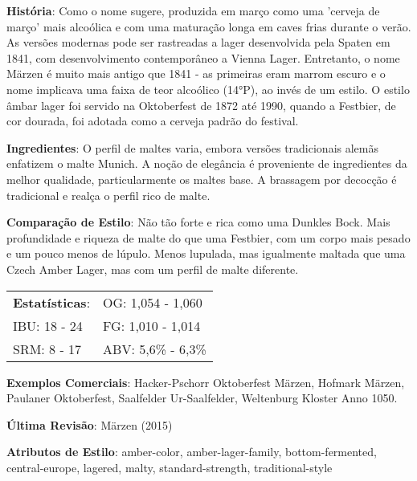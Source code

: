 \textbf{História}: Como o nome sugere, produzida em março como uma 'cerveja de março' mais alcoólica e com uma maturação longa em caves frias durante o verão. As versões modernas pode ser rastreadas a lager desenvolvida pela Spaten em 1841, com desenvolvimento contemporâneo a Vienna Lager. Entretanto, o nome Märzen é muito mais antigo que 1841 - as primeiras eram marrom escuro e o nome implicava uma faixa de teor alcoólico (14°P), ao invés de um estilo. O estilo âmbar lager foi servido na Oktoberfest de 1872 até 1990, quando a Festbier, de cor dourada, foi adotada como a cerveja padrão do festival.

\textbf{Ingredientes}: O perfil de maltes varia, embora versões tradicionais alemãs enfatizem o malte Munich. A noção de elegância é proveniente de ingredientes da melhor qualidade, particularmente os maltes base. A brassagem por decocção é tradicional e realça o perfil rico de malte.

\textbf{Comparação de Estilo}: Não tão forte e rica como uma Dunkles Bock. Mais profundidade e riqueza de malte do que uma Festbier, com um corpo mais pesado e um pouco menos de lúpulo. Menos lupulada, mas igualmente maltada que uma Czech Amber Lager, mas com um perfil de malte diferente.

\begin{tabular}{@{}p{35mm}p{35mm}@{}}
  \textbf{Estatísticas}: & OG: 1,054 - 1,060 \\
  IBU: 18 - 24  & FG: 1,010 - 1,014  \\
  SRM: 8 - 17  & ABV: 5,6\% - 6,3\%
\end{tabular}

\textbf{Exemplos Comerciais}: Hacker-Pschorr Oktoberfest Märzen, Hofmark Märzen, Paulaner Oktoberfest, Saalfelder Ur-Saalfelder, Weltenburg Kloster Anno 1050.

\textbf{Última Revisão}: Märzen (2015)

\textbf{Atributos de Estilo}: amber-color, amber-lager-family, bottom-fermented, central-europe, lagered, malty, standard-strength, traditional-style
